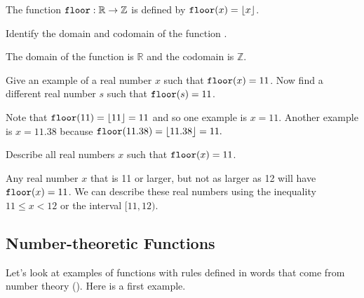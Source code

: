 \begin{exam}
\label{exam_floor_function}
    The function $\texttt{floor}:\mathbb{R} \to \mathbb{Z}$ is defined by $\texttt{floor}(x) = \lfloor x \rfloor$. 
        \begin{apart}
            \item Identify the domain and codomain of the function .
                \begin{soln}
                    The domain of the function  is $\mathbb{R}$ and the codomain is $\mathbb{Z}$.
                \end{soln}
            \item Give an example of a real number $x$ such that $\texttt{floor}(x) = 11$.  Now find a different real number $s$ such that $\texttt{floor}(s)=11$.   
                \begin{soln}
                    Note that $\texttt{floor}(11) = \lfloor 11 \rfloor = 11$ and so one example is $x=11$.  Another example is $x = 11.38$ because $\texttt{floor}(11.38) = \lfloor 11.38 \rfloor = 11.$
                \end{soln}
            \item \label{part_floor11} Describe all real numbers $x$ such that $\texttt{floor}(x)=11$. 
                \begin{soln}
                    Any real number $x$ that is 11 or larger, but not as larger as 12 will have $\texttt{floor}(x)=11$.  We can describe these real numbers using the inequality $11 \le x < 12$ or the interval $[11,12)$.
                \end{soln}
        \end{apart}    
\end{exam}


\newcommand{\subnumberfn}{Number-theoretic Functions}
\subsection{\subnumberfn}
\label{sub_number_theoretic_functions}

Let's look at examples of functions with rules defined in words that come from number theory ().  Here is a first example.

